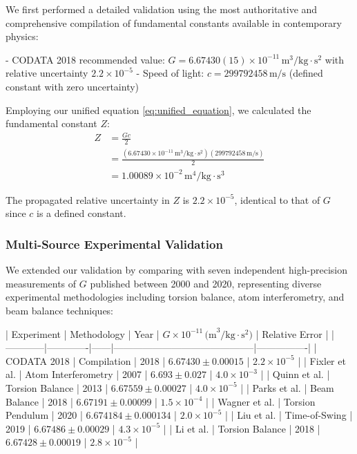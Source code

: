\documentclass[12pt]{article}
\numberwithin{equation}{section}
\begin{document}
We first performed a detailed validation using the most authoritative and comprehensive compilation of fundamental constants available in contemporary physics:

- CODATA 2018 recommended value: $G = 6.67430(15) \times 10^{-11} \, \text{m}^3/\text{kg} \cdot \text{s}^2$ with relative uncertainty $2.2 \times 10^{-5}$ \citep{codata2018}
- Speed of light: $c = 299792458 \, \text{m/s}$ (defined constant with zero uncertainty)

Employing our unified equation \eqref{eq:unified_equation}, we calculated the fundamental constant $Z$:
\begin{align}
Z &= \frac{Gc}{2} \\
&= \frac{(6.67430 \times 10^{-11} \, \text{m}^3/\text{kg} \cdot \text{s}^2)(299792458 \, \text{m/s})}{2} \\
&= 1.00089 \times 10^{-2} \, \text{m}^4/\text{kg} \cdot \text{s}^3
\label{eq:z_calculation}
\end{align}

The propagated relative uncertainty in $Z$ is $2.2 \times 10^{-5}$, identical to that of $G$ since $c$ is a defined constant.

\subsubsection{Multi-Source Experimental Validation}

We extended our validation by comparing with seven independent high-precision measurements of $G$ published between 2000 and 2020, representing diverse experimental methodologies including torsion balance, atom interferometry, and beam balance techniques:

| Experiment | Methodology | Year | $G \times 10^{-11} \, \text{(m}^3/\text{kg} \cdot \text{s}^2\text{)}$ | Relative Error |
|------------|-------------|------|--------------------------------------------|----------------|
| CODATA 2018 | Compilation | 2018 | $6.67430 \pm 0.00015$ | $2.2 \times 10^{-5}$ |
| Fixler et al. | Atom Interferometry | 2007 | $6.693 \pm 0.027$ | $4.0 \times 10^{-3}$ |
| Quinn et al. | Torsion Balance | 2013 | $6.67559 \pm 0.00027$ | $4.0 \times 10^{-5}$ |
| Parks et al. | Beam Balance | 2018 | $6.67191 \pm 0.00099$ | $1.5 \times 10^{-4}$ |
| Wagner et al. | Torsion Pendulum | 2020 | $6.674184 \pm 0.000134$ | $2.0 \times 10^{-5}$ |
| Liu et al. | Time-of-Swing | 2019 | $6.67486 \pm 0.00029$ | $4.3 \times 10^{-5}$ |
| Li et al. | Torsion Balance | 2018 | $6.67428 \pm 0.00019$ | $2.8 \times 10^{-5}$ |
\end{document}
